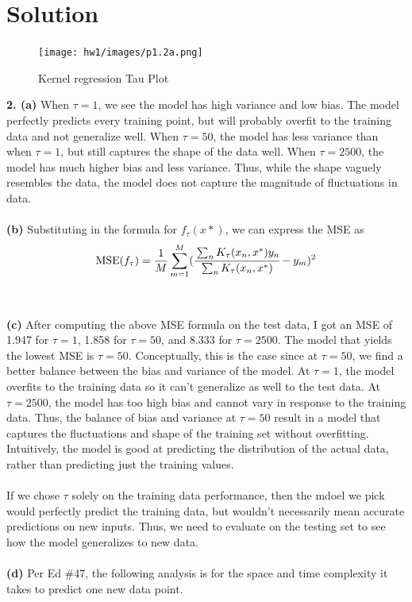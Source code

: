 \documentclass[submit]{../harvardml}
\newenvironment{solution}
  {\color{black}\section*{Solution}}
{}
\begin{document}
\begin{solution}
\begin{figure}
        \centering
        \texttt{[image: hw1/images/p1.2a.png]}
        \caption{Kernel regression Tau Plot}
    \end{figure}
    \begin{tcolorbox}
        \textbf{2. (a)} When $\tau = 1$, we see the model has high variance and low bias. The model perfectly predicts every training point, but will probably overfit to the training data and not generalize well. When $\tau = 50$, the model has less variance than when $\tau = 1$, but still captures the shape of the data well. When $\tau = 2500$, the model has much higher bias and less variance. Thus, while the shape vaguely resembles the data, the model does not capture the magnitude of fluctuations in data.
        \\
        \\
        \textbf{(b)} Substituting in the formula for $f_{\tau}(x*)$, we can express the MSE as
        $$\text{MSE}(f_\tau) = \frac{1}{M} \sum_{m=1}^M (\cfrac{\sum_{n} K_\tau(x_n,x^*) y_n}{\sum_n K_\tau(x_n, x^*)} - y_m)^2$$
        \\
        \\
        \textbf{(c)} After computing the above MSE formula on the test data, I got an MSE of 1.947 for $\tau = 1$, 1.858 for $\tau = 50$, and 8.333 for $\tau = 2500$. The model that yields the lowest MSE is $\tau = 50$. Conceptually, this is the case since at $\tau = 50$, we find a better balance between the bias and variance of the model. At $\tau = 1$, the model overfits to the training data so it can't generalize as well to the test data. At $\tau = 2500$, the model has too high bias and cannot vary in response to the training data. Thus, the balance of bias and variance at $\tau = 50$ result in a model that captures the fluctuations and shape of the training set without overfitting. Intuitively, the model is good at predicting the distribution of the actual data, rather than predicting just the training values.
        \\
        \\
        If we chose $\tau$ solely on the training data performance, then the mdoel we pick would perfectly predict the training data, but wouldn't necessarily mean accurate predictions on new inputs. Thus, we need to evaluate on the testing set to see how the model generalizes to new data. 
        \\
        \\
        \textbf{(d)} Per Ed \#47, the following analysis is for the space and time complexity it takes to predict one new data point. 

\end{tcolorbox}
\end{solution}
\end{document}
